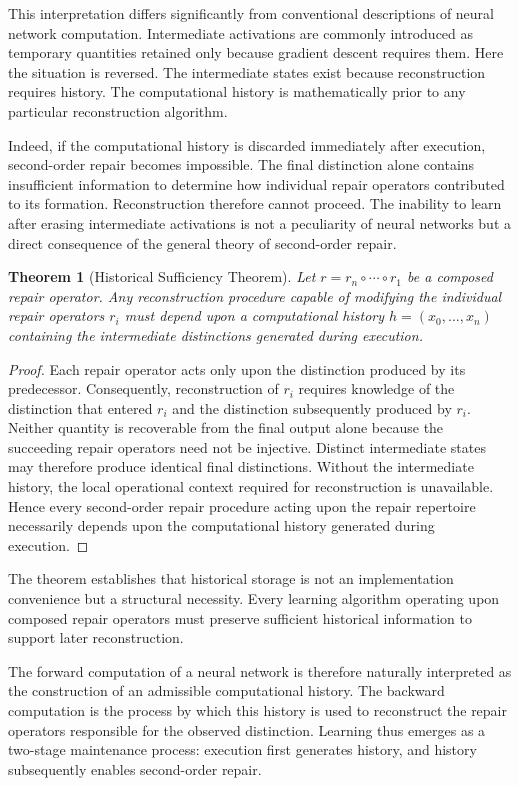 \documentclass[12pt,oneside]{article}
\theoremstyle{plain}
\newtheorem{theorem}{Theorem}[section]
\theoremstyle{definition}
\theoremstyle{remark}
\theoremstyle{plain}
\begin{document}
This interpretation differs significantly from conventional descriptions of neural network
computation. Intermediate activations are commonly introduced as temporary quantities retained only
because gradient descent requires them. Here the situation is reversed. The intermediate states
exist because reconstruction requires history. The computational history is mathematically prior
to any particular reconstruction algorithm.

Indeed, if the computational history is discarded immediately after execution, second-order repair
becomes impossible. The final distinction alone contains insufficient information to determine how
individual repair operators contributed to its formation. Reconstruction therefore cannot proceed.
The inability to learn after erasing intermediate activations is not a peculiarity of neural
networks but a direct consequence of the general theory of second-order repair.

\begin{theorem}[Historical Sufficiency Theorem]
Let $r = r_n \circ \cdots \circ r_1$ be a composed repair operator. Any reconstruction procedure
capable of modifying the individual repair operators $r_i$ must depend upon a computational history
$h = (x_0, \ldots, x_n)$ containing the intermediate distinctions generated during execution.
\end{theorem}

\begin{proof}
Each repair operator acts only upon the distinction produced by its predecessor. Consequently,
reconstruction of $r_i$ requires knowledge of the distinction that entered $r_i$ and the
distinction subsequently produced by $r_i$. Neither quantity is recoverable from the final output
alone because the succeeding repair operators need not be injective. Distinct intermediate states
may therefore produce identical final distinctions. Without the intermediate history, the local
operational context required for reconstruction is unavailable. Hence every second-order repair
procedure acting upon the repair repertoire necessarily depends upon the computational history
generated during execution.
\end{proof}

The theorem establishes that historical storage is not an implementation convenience but a
structural necessity. Every learning algorithm operating upon composed repair operators must
preserve sufficient historical information to support later reconstruction.

The forward computation of a neural network is therefore naturally interpreted as the construction
of an admissible computational history. The backward computation is the process by which this
history is used to reconstruct the repair operators responsible for the observed distinction.
Learning thus emerges as a two-stage maintenance process: execution first generates history, and
history subsequently enables second-order repair.
\end{document}
